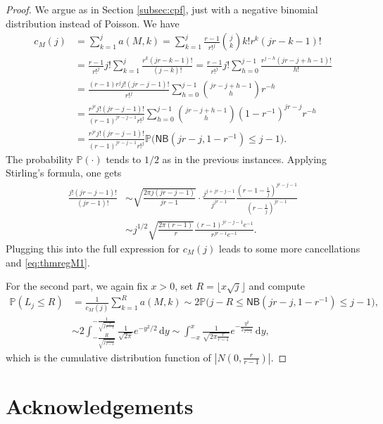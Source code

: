 \documentclass[letterpaper]{amsart}
\theoremstyle{plain}
\theoremstyle{definition}
\theoremstyle{remark}
\newcommand{\floor}[1]{\lfloor #1 \rfloor}
\newcommand{\Di}{\,\mathrm{d}}
\newcommand{\IP}{\mathbb{P}}
\newcommand{\NB}{\mathsf{NB}}
\begin{document}
\begin{proof}
We argue as in Section \ref{subsec:cpf}, just with a negative binomial distribution instead of Poisson. We have
\begin{align*}
    c_M(j) &= \sum_{k=1}^j a(M,k)
    = \sum_{k=1}^j \frac{r-1}{r!^{j}} \binom{j}{k} k! r^k (jr-k-1)! \\
    &= \frac{r-1}{r!^{j}} j! \sum_{k=1}^j  \frac{r^k (jr-k-1)!}{(j-k)!}
    = \frac{r-1}{r!^{j}} j! \sum_{h=0}^{j-1}  \frac{r^{j-h} (jr-j+h-1)!}{h!} \\
    &= \frac{(r-1)r^j j!(jr-j-1)!}{r!^{j}}  \sum_{h=0}^{j-1} \binom{jr-j+h-1}{h} r^{-h} \\
    &= \frac{r^{jr} j!(jr-j-1)!}{(r-1)^{jr-j-1}r!^{j}}  \sum_{h=0}^{j-1} \binom{jr-j+h-1}{h} (1-r^{-1})^{jr-j} r^{-h} \\
    &= \frac{r^{jr} j!(jr-j-1)!}{(r-1)^{jr-j-1}r!^{j}} 
    \IP\big(\NB(jr-j,1-r^{-1})\leq j-1\big).
\end{align*}
The probability $\IP(\cdot)$ tends to $1/2$ as in the previous instances. Applying Stirling's formula, one gets
\begin{align*}
 \frac{j!(jr-j-1)!}{(jr-1)!} 
 &\sim \sqrt{\frac{2\pi j(jr-j-1)}{jr-1}} \cdot \frac{j^{j+jr-j-1}}{j^{jr-1}} \frac{\left(r-1-\frac{1}{j}\right)^{jr-j-1}}{\left(r-\frac{1}{j}\right)^{jr-1}}\\
 &\sim j^{1/2} \sqrt{\frac{2\pi (r-1)}{r}} \frac{(r-1)^{jr-j-1} e^{-1}}{r^{jr-1} e^{-1}}.
\end{align*}
Plugging this into the full expression for $c_M(j)$ leads to some more cancellations and \eqref{eq:thmregM1}.

For the second part, we again fix $x>0$, set $R=\floor{x\sqrt{j}}$ and compute
 \begin{align*}
  \IP( L_j \leq R)
  &= \frac{1}{c_M(j)} \sum_{k=1}^R a(M,k)
   \sim
    2\IP\big(j-R\leq \NB(jr-j,1-r^{-1})\leq j-1\big), \\
  &\sim 2\int_{-\frac{R}{\sqrt{j\frac{r}{r-1}}}}^{-\frac{1}{\sqrt{j\frac{r}{r-1}}}} \frac{1}{\sqrt{2\pi}} e^{-y^2/2} \Di y
   \sim \int_{-x}^x \frac{1}{\sqrt{2\pi \frac{r}{r-1}}} e^{-\frac{y^2}{2\frac{r}{r-1}}} \Di y,
 \end{align*}
 which is the cumulative distribution function of $\left|N\left(0,\frac{r}{r-1}\right)\right|$.
\end{proof}


\section*{Acknowledgements}
\end{document}
